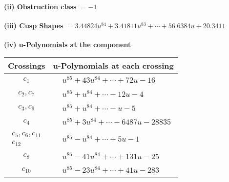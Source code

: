 \documentclass[1p]{elsarticle_modified}
\theoremstyle{definition}
\begin{document}
\flushleft \textbf{(ii) Obstruction class $= -1$}\\~\\
\flushleft \textbf{(iii) Cusp Shapes $= 3.44824 u^{84}+3.41811 u^{83}+\cdots+56.6384 u+20.3411$}\\~\\
\newpage\renewcommand{\arraystretch}{1}
\flushleft \textbf{(iv) u-Polynomials at the component}\newline \\
\begin{tabular}{m{50pt}|m{274pt}}
Crossings & \hspace{64pt}u-Polynomials at each crossing \\
\hline $$\begin{aligned}c_{1}\end{aligned}$$&$\begin{aligned}
&u^{85}+43 u^{84}+\cdots+72 u-16
\end{aligned}$\\
\hline $$\begin{aligned}c_{2},c_{7}\end{aligned}$$&$\begin{aligned}
&u^{85}+u^{84}+\cdots-12 u-4
\end{aligned}$\\
\hline $$\begin{aligned}c_{3},c_{9}\end{aligned}$$&$\begin{aligned}
&u^{85}+u^{84}+\cdots- u-5
\end{aligned}$\\
\hline $$\begin{aligned}c_{4}\end{aligned}$$&$\begin{aligned}
&u^{85}+3 u^{84}+\cdots-6487 u-28835
\end{aligned}$\\
\hline $$\begin{aligned}c_{5},c_{6},c_{11}\\c_{12}\end{aligned}$$&$\begin{aligned}
&u^{85}- u^{84}+\cdots+5 u-1
\end{aligned}$\\
\hline $$\begin{aligned}c_{8}\end{aligned}$$&$\begin{aligned}
&u^{85}-41 u^{84}+\cdots+131 u-25
\end{aligned}$\\
\hline $$\begin{aligned}c_{10}\end{aligned}$$&$\begin{aligned}
&u^{85}-23 u^{84}+\cdots+41 u-283
\end{aligned}$\\
\hline
\end{tabular}\\~\\
\end{document}

